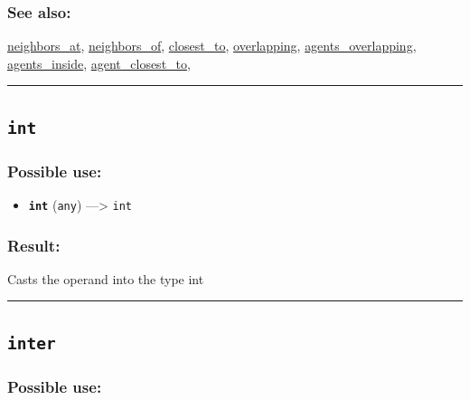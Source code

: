 \documentclass[]{book}
\providecommand{\tightlist}{%
  \setlength{\itemsep}{0pt}\setlength{\parskip}{0pt}}
\theoremstyle{definition}
\theoremstyle{definition}
\theoremstyle{definition}
\theoremstyle{remark}
\begin{document}
\subsubsection{See also:}\label{see-also-118}

\href{operators-n-to-r.html\#neighbors_at}{neighbors\_at},
\href{operators-n-to-r.html\#neighbors_of}{neighbors\_of},
\href{operators-b-to-c.html\#closest_to}{closest\_to},
\href{operators-n-to-r.html\#overlapping}{overlapping},
\href{operators-a-to-a.html\#agents_overlapping}{agents\_overlapping},
\href{operators-a-to-a.html\#agents_inside}{agents\_inside},
\href{operators-a-to-a.html\#agent_closest_to}{agent\_closest\_to},

\begin{center}\rule{0.5\linewidth}{\linethickness}\end{center}

\subsection{\texorpdfstring{\texttt{int}}{int}}\label{int}

\subsubsection{Possible use:}\label{possible-use-276}

\begin{itemize}
\tightlist
\item
  \textbf{\texttt{int}} (\texttt{any}) ---\textgreater{} \texttt{int}
\end{itemize}

\subsubsection{Result:}\label{result-266}

Casts the operand into the type int

\begin{center}\rule{0.5\linewidth}{\linethickness}\end{center}

\subsection{\texorpdfstring{\texttt{inter}}{inter}}\label{inter}

\subsubsection{Possible use:}\label{possible-use-277}
\end{document}
